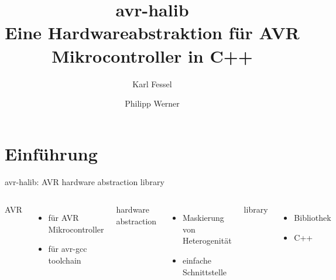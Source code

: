 \documentclass[11pt]{beamer}
\title[avr-halib]{\textbf{avr-halib} \\ Eine Hardwareabstraktion für AVR Mikrocontroller in C++}
\author{Karl Fessel \and Philipp Werner}
\institute{EOS.IVS.FIN.OvGU}
\begin{document}
\frame{\titlepage}


\section{Einführung}

\begin{frame}{avr-halib: AVR hardware abstraction library}


\begin{columns}[t]
		\begin{center}{
			AVR
		}\end{center}
		\begin{itemize}
			\item für AVR Mikrocontroller
			\item für avr-gcc toolchain
		\end{itemize}
		

		\begin{center}{
			hardware abstraction
		}\end{center}
		\begin{itemize}
			\item Maskierung von Heterogenität
			\item einfache Schnittstelle
		\end{itemize}

		\begin{center}{
			library
		}\end{center}
		\begin{itemize}
			\item Bibliothek	%
			\item C++		%
		\end{itemize}

\end{columns}


\end{frame}
\end{document}
